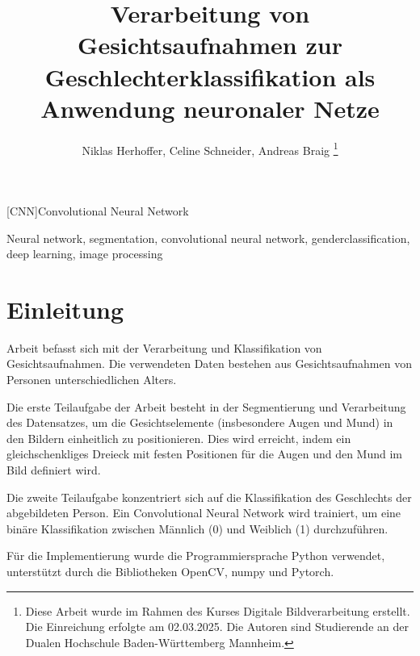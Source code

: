 \documentclass[journal,twoside,web]{ieeecolor}
\begin{document}
\begin{acronym}
    [CNN]{Convolutional Neural Network} 
\end{acronym}

\title{Verarbeitung von Gesichtsaufnahmen zur Geschlechterklassifikation als Anwendung neuronaler Netze}
\author{Niklas Herhoffer, Celine Schneider, Andreas Braig
\thanks{Diese Arbeit wurde im Rahmen des Kurses Digitale Bildverarbeitung erstellt. Die Einreichung erfolgte am 02.03.2025. Die Autoren sind Studierende an der Dualen Hochschule Baden-Württemberg Mannheim.}
}


\maketitle

    


\begin{IEEEkeywords}
    Neural network, segmentation, convolutional neural network, genderclassification, deep learning, image processing
\end{IEEEkeywords}

\section{Einleitung}
\label{sec:introduction}
 Arbeit befasst sich mit der Verarbeitung und Klassifikation von Gesichtsaufnahmen. Die verwendeten Daten bestehen aus Gesichtsaufnahmen von Personen unterschiedlichen Alters. 

Die erste Teilaufgabe der Arbeit besteht in der Segmentierung und Verarbeitung des Datensatzes, um die Gesichtselemente (insbesondere Augen und Mund) in den Bildern einheitlich zu positionieren. Dies wird erreicht, indem ein gleichschenkliges Dreieck mit festen Positionen für die Augen und den Mund im Bild definiert wird. 

Die zweite Teilaufgabe konzentriert sich auf die Klassifikation des Geschlechts der abgebildeten Person. Ein Convolutional Neural Network wird trainiert, um eine binäre Klassifikation zwischen Männlich (0) und Weiblich (1) durchzuführen.

Für die Implementierung wurde die Programmiersprache Python verwendet, unterstützt durch die Bibliotheken OpenCV, numpy und Pytorch.
\end{document}
